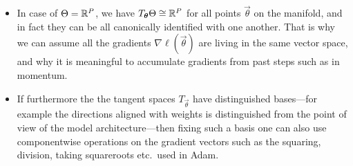 \documentclass[12pt]{amsart}
\begin{document}
\begin{itemize}
\item In case of $\Theta = \mathbb{R}^P$, we have $T_{\mathbf{\boldsymbol{\theta}}} \Theta \cong \mathbb{R}^P$ for all points $\vec{\theta}$ on the manifold, and in fact they can be all canonically identified with one another. That is why we can assume all the gradients $\nabla \ell(\vec{\theta})$ are living in the same vector space, and why it is meaningful to accumulate gradients from past steps such as in momentum.
\item If furthermore the the tangent spaces $T_{\vec{\theta}}$ have distinguished bases---for example the directions aligned with weights is distinguished from the point of view of the model architecture---then fixing such a basis one can also use componentwise operations on the gradient vectors such as the squaring, division, taking squareroots etc.\ used in Adam.
\end{itemize}
\end{document}
